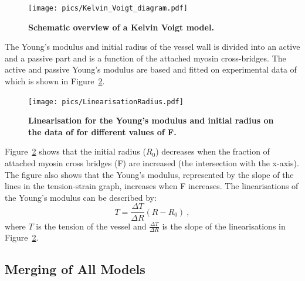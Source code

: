 \begin{figure}[h!]
  \centering
  \texttt{[image: pics/Kelvin\_Voigt\_diagram.pdf]}
  \caption{\textbf{Schematic overview of a Kelvin Voigt model.}}
  \label{fig:KelvinVoigt}
\end{figure}

The Young's modulus and initial radius of the vessel wall is divided into an active and a passive part and is a function of the attached myosin cross-bridges. The active and passive Young's modulus are based and fitted on experimental data of \citet{Gore} which is shown in Figure~\ref{fig:LinearisationRadius}. 

\begin{figure}[h!]
  \centering
  \texttt{[image: pics/LinearisationRadius.pdf]}
  \caption{\textbf{Linearisation for the Young's modulus and initial radius on the data of \citet{Gore} for different values of F.}}
  \label{fig:LinearisationRadius}
\end{figure}

Figure~\ref{fig:LinearisationRadius} shows that the initial radius ($R_0$) decreases when the fraction of attached myosin cross bridges (F) are increased (the intersection with the x-axis). The figure also shows that the Young's modulus, represented by the slope of the lines in the tension-strain graph, increases when F increases. The linearisations of the Young's modulus can be described by:
\begin{equation} \label{eq:Fbalans4}
T=\frac{\Delta T}{\Delta R}(R-R_0)~,
\end{equation}
where $T$ is the tension of the vessel and $\frac{\Delta T}{\Delta R}$ is the slope of the linearisations in Figure~\ref{fig:LinearisationRadius}. \\

\newpage
\subsection{Merging of All Models}

